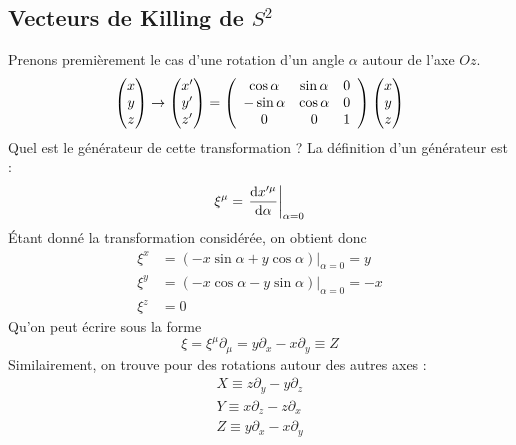 \subsection{Vecteurs de Killing de $S^2$}
Prenons premièrement le cas d'une rotation d'un angle $\alpha$ autour de l'axe $Oz$.
\begin{equation}
    \begin{pmatrix}
        x\\
        y\\
        z
    \end{pmatrix} 
    \rightarrow 
    \begin{pmatrix}
        x'\\
        y'\\
        z'
    \end{pmatrix} 
    = \left(
    \begin{array}{ccc}
        \cos \alpha & \sin\alpha & 0 \\
        -\sin\alpha & \cos \alpha & 0 \\
        0 & 0 & 1 
    \end{array}
    \right) 
    \begin{pmatrix}
        x\\
        y\\
        z
    \end{pmatrix}
\end{equation}
Quel est le générateur de cette transformation ? La définition d'un générateur est :
\begin{equation}
    \xi^{\mu} = \left. \frac{\mathrm{d} x'^{\mu}}{\mathrm{d} \alpha}\right|_{\alpha = 0}
\end{equation}
Étant donné la transformation considérée, on obtient donc
\begin{align}
    \xi^{x} &= (-x\sin{\alpha} + y\cos{\alpha})\big |_{\alpha = 0} = y\\
    \xi^{y} &= (-x\cos{\alpha} - y\sin{\alpha})\big |_{\alpha = 0} = -x\\
    \xi^{z} &= 0
\end{align}
Qu'on peut écrire sous la forme 
\begin{equation}
    \xi = \xi^{\mu}\partial_{\mu} = y\partial_{x} - x\partial_{y} \equiv Z
\end{equation}
Similairement, on trouve pour des rotations autour des autres axes :
\begin{align}
    X \equiv z\partial_{y}-y\partial_{z} \\
    Y \equiv x\partial_{z} - z\partial_{x}\\
    Z \equiv y\partial_x - x \partial_y
\end{align}
